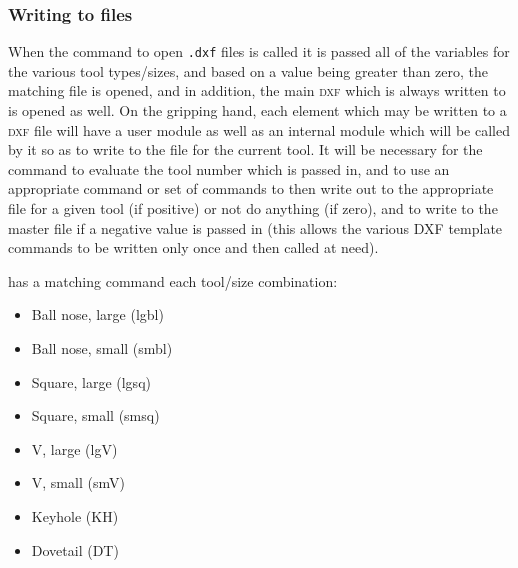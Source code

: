 \documentclass{ltxdoc}
\begin{document}
\subsubsection{Writing to files}
 
When the command to open \verb|.dxf| files is called it is passed all of the variables for the various tool types/sizes, and based on a value being greater than zero, the matching file is opened, and in addition, the main \textsc{dxf} which is always written to is opened as well. On the gripping hand, each element which may be written to a \textsc{dxf} file will have a user module as well as an internal module which will be called by it so as to write to the file for the current tool. It will be necessary for the  command to evaluate the tool number which is passed in, and to use an appropriate command or set of commands to then write out to the appropriate file for a given tool (if positive) or not do anything (if zero), and to write to the master file if a negative value is passed in (this allows the various DXF template commands to be written only once and then called at need).

\noindent has a matching command each tool/size combination:

\begin{itemize}
\item Ball nose, large (lgbl) 
\item Ball nose, small (smbl) 
\item Square, large (lgsq) 
\item Square, small (smsq) 
\item V, large (lgV) 
\item V, small (smV) 
\item Keyhole (KH) 
\item Dovetail (DT) 
\end{itemize}
 
\end{document}

